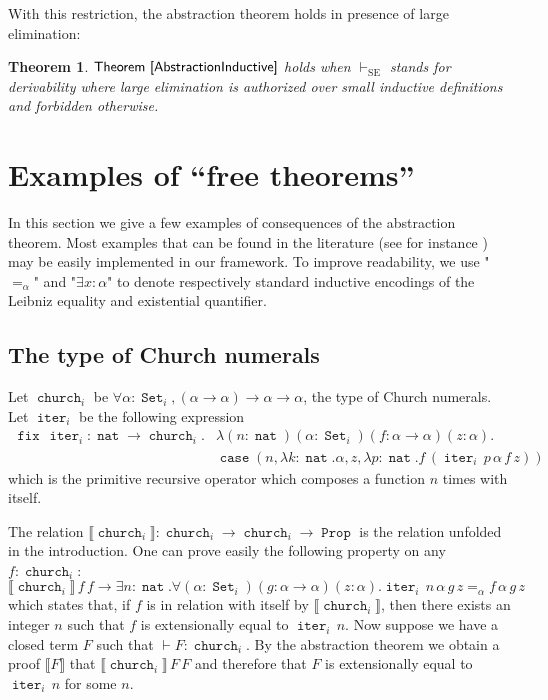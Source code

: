 \documentclass[a4paper,USenglish]{lipics}
\newtheorem{thm}{Theorem}
\DeclareMathOperator{\Prop}{\mathtt{Prop}}
\DeclareMathOperator{\Set}{\mathtt{Set}}
\DeclareMathOperator{\Nat}{\mathtt{nat}}
\DeclareMathOperator{\Church}{\mathtt{church}}
\DeclareMathOperator{\Iter}{\mathtt{iter}}
\DeclareMathOperator{\case}{\mathtt{case}}
\DeclareMathOperator{\fix}{\mathtt{fix}}
\newcommand{\we}{⊢_{\mathop{\text{SE}}}}
\begin{document}
With this restriction, the abstraction theorem holds in presence of
large elimination:
\begin{thm}
  $\textsf{Theorem~\ref{AbstractionInductive}}$ holds
  when $\we$ stands for derivability where large elimination
  is authorized over small inductive definitions and forbidden
  otherwise.
\end{thm}


\section{Examples of ``free theorems''}\label{sec:examples}

In this section we give a few examples of consequences of the abstraction
theorem. Most examples that can be found in the literature (see for
instance \cite{Wadler89, DBLP:conf/icfp/BernardyJP10})
may be easily implemented in our framework.
To improve readability, we use "$=_α$" and "$∃x:α$" to denote respectively
standard inductive encodings of the Leibniz equality and existential quantifier.

\subsection{The type of Church numerals}\label{sec:examples:church}

Let $\Church_i$ be $∀α:\Set_i, (α → α) → α → α$, the type
of Church numerals. Let $\Iter_i$ be the following expression
\begin{align*}
 \fix\,\Iter_i : \Nat → \Church_i.
& λ (n : \Nat)(α : \Set_i)(f : α → α)(z: α). \\
 & \case(n,λk:\Nat.α,z,λp:\Nat.f\,(\Iter_i\,p\,α\,f\,z))
\end{align*}
which is the primitive recursive operator which composes a function
$n$ times with itself.

The relation $⟦\Church_i⟧ : \Church_i → \Church_i → \Prop$ is the
relation unfolded in the introduction. One can prove easily the following
property on any $f : \Church_i$:
\[
  ⟦\Church_i⟧\,f\,f →  ∃ n : \Nat.
  ∀ (α : \Set_i) (g : α → α) (z:α). \Iter_i\,n\,α\,g\,z =_α f\,α\,g\,z
\]
which states that, if $f$ is in relation with itself by $⟦\Church_i⟧$,
then there exists an integer $n$ such that $f$ is
extensionally equal to $\Iter_i\,n$. Now suppose we have a
closed term $F$ such that $⊢ F : \Church_i$. By the abstraction theorem
we obtain a proof $⟦F⟧$ that $⟦\Church_i⟧\,F\,F$ and therefore that $F$
is extensionally equal to $\Iter_i\,n$ for some $n$.
\end{document}
